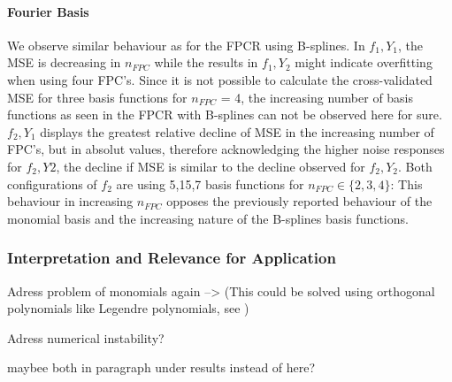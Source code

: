 \documentclass[11pt,twoside,a4paper]{article}
\begin{document}
	
	\paragraph{Fourier Basis}
	We observe similar behaviour as for the FPCR using B-splines. In $f_1,Y_1$, the MSE is decreasing in $n_{FPC}$ while the results in $f_1,Y_2$ might indicate overfitting when using four FPC's. Since it is not possible to calculate the cross-validated MSE for three basis functions for $n_{FPC}$ = 4, the increasing number of basis functions as seen in the FPCR with B-splines can not be observed here for sure. $f_2,Y_1$ displays the greatest relative decline of MSE in the increasing number of FPC's, but in absolut values, therefore acknowledging the higher noise responses for $f_2,Y2$, the decline if MSE is similar to the decline observed for $f_2,Y_2$. Both configurations of $f_2$ are using 5,15,7 basis functions for $n_{FPC} \in \{2, 3, 4 \}$: This behaviour in increasing $n_{FPC}$ opposes the previously reported behaviour of the monomial basis and the increasing nature of the B-splines basis functions.
	
	
	
	
	
	\subsubsection{Interpretation and Relevance for Application}
	
	Adress problem of monomials again --> (This could be solved using orthogonal polynomials like Legendre polynomials, see \cite{Dattoli_2001})
	
	Adress numerical instability?
	
	maybee both in paragraph under results instead of here?
	
	
\end{document}
